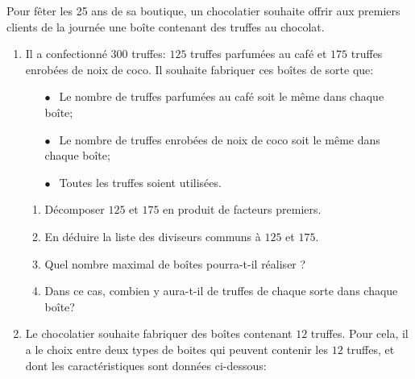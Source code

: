
\medskip

Pour fêter les 25 ans de sa boutique, un chocolatier souhaite offrir aux premiers clients de la journée une boîte contenant des truffes au chocolat.

\medskip

\begin{enumerate}
\item Il a confectionné $300$ truffes: $125$ truffes parfumées au café et $175$ truffes enrobées de noix de coco. Il souhaite fabriquer ces boîtes de sorte que:

\setlength\parindent{1cm}
\begin{itemize}
\item[$\bullet~~$] Le nombre de truffes parfumées au café soit le même dans chaque boîte;
\item[$\bullet~~$] Le nombre de truffes enrobées de noix de coco soit le même dans chaque boîte;
\item[$\bullet~~$] Toutes les truffes soient utilisées.
\end{itemize}
\setlength\parindent{0cm}

	\begin{enumerate}
		\item Décomposer $125$ et $175$ en produit de facteurs premiers.
		\item En déduire la liste des diviseurs communs à $125$ et $175$.
		\item Quel nombre maximal de boîtes pourra-t-il réaliser ?
		\item Dans ce cas, combien y aura-t-il de truffes de chaque sorte dans chaque boîte?
	\end{enumerate}	
\item Le chocolatier souhaite fabriquer des boîtes contenant $12$ truffes. Pour cela, il a le choix entre deux types de boites qui peuvent contenir les $12$ truffes, et dont les caractéristiques sont données ci-dessous:


\end{enumerate}
